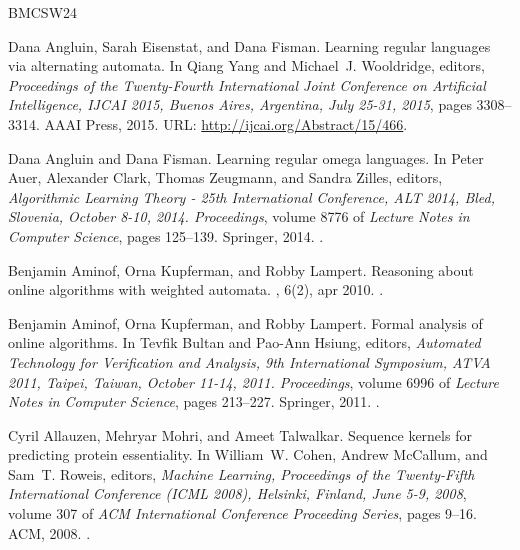 \documentclass[10pt,a4paper]{amsart}
\theoremstyle{definition}
\numberwithin{equation}{section}
\numberwithin{theorem}{section}
\begin{document}
\newcommand{\etalchar}[1]{$^{#1}$}
\begin{thebibliography}{BMCSW24}

Dana Angluin, Sarah Eisenstat, and Dana Fisman.
\newblock Learning regular languages via alternating automata.
\newblock In Qiang Yang and Michael~J. Wooldridge, editors, {\em Proceedings of
  the Twenty-Fourth International Joint Conference on Artificial Intelligence,
  {IJCAI} 2015, Buenos Aires, Argentina, July 25-31, 2015}, pages 3308--3314.
  {AAAI} Press, 2015.
\newblock URL: \url{http://ijcai.org/Abstract/15/466}.

Dana Angluin and Dana Fisman.
\newblock Learning regular omega languages.
\newblock In Peter Auer, Alexander Clark, Thomas Zeugmann, and Sandra Zilles,
  editors, {\em Algorithmic Learning Theory - 25th International Conference,
  {ALT} 2014, Bled, Slovenia, October 8-10, 2014. Proceedings}, volume 8776 of
  {\em Lecture Notes in Computer Science}, pages 125--139. Springer, 2014.
\newblock \href {https://doi.org/10.1007/978-3-319-11662-4\_10}
  {}.

Benjamin Aminof, Orna Kupferman, and Robby Lampert.
\newblock Reasoning about online algorithms with weighted automata.
, 6(2), apr 2010.
\newblock \href {https://doi.org/10.1145/1721837.1721844}
  {}.

Benjamin Aminof, Orna Kupferman, and Robby Lampert.
\newblock Formal analysis of online algorithms.
\newblock In Tevfik Bultan and Pao{-}Ann Hsiung, editors, {\em Automated
  Technology for Verification and Analysis, 9th International Symposium, {ATVA}
  2011, Taipei, Taiwan, October 11-14, 2011. Proceedings}, volume 6996 of {\em
  Lecture Notes in Computer Science}, pages 213--227. Springer, 2011.
\newblock \href {https://doi.org/10.1007/978-3-642-24372-1\_16}
  {}.

Cyril Allauzen, Mehryar Mohri, and Ameet Talwalkar.
\newblock Sequence kernels for predicting protein essentiality.
\newblock In William~W. Cohen, Andrew McCallum, and Sam~T. Roweis, editors,
  {\em Machine Learning, Proceedings of the Twenty-Fifth International
  Conference {(ICML} 2008), Helsinki, Finland, June 5-9, 2008}, volume 307 of
  {\em {ACM} International Conference Proceeding Series}, pages 9--16. {ACM},
  2008.
\newblock \href {https://doi.org/10.1145/1390156.1390158}
  {}.


\end{thebibliography}
\end{document}
